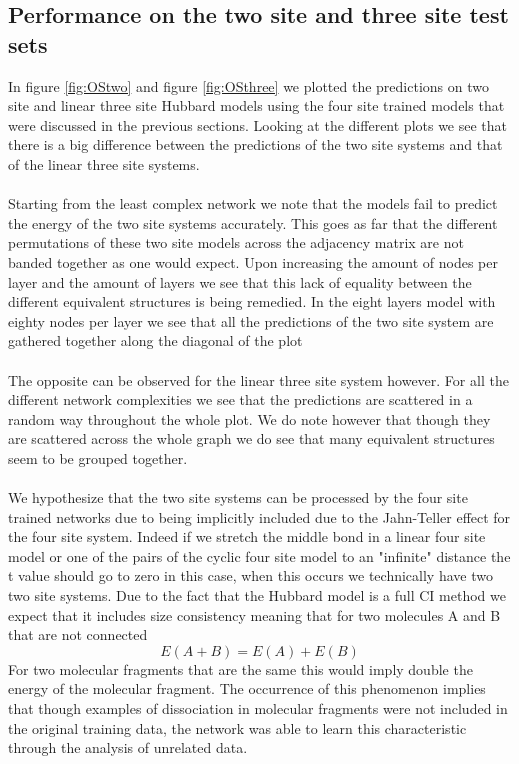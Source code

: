 \documentclass[12pt]{article}
\begin{document}
\subsection{Performance on the two site and three site test sets}
In figure \ref{fig:OStwo} and figure \ref{fig:OSthree} we plotted the predictions on two site and linear three site Hubbard models using the four site trained models that were discussed in the previous sections. Looking at the different plots we see that there is a big difference between the predictions of the two site systems and that of the linear three site systems.
\\
\\
Starting from the least complex network we note that the models fail to predict the energy of the two site systems accurately. This goes as far that the different permutations of these two site models across the adjacency matrix are not banded together as one would expect. Upon increasing the amount of nodes per layer and the amount of layers we see that this lack of equality between the different equivalent structures is being remedied. In the eight layers model with eighty nodes per layer we see that all the predictions of the two site system are gathered together along the diagonal of the plot
\\
\\
The opposite can be observed for the linear three site system however. For all the different network complexities we see that the predictions are scattered in a random way throughout the whole plot. We do note however that though they are scattered across the whole graph we do see that many equivalent structures seem to be grouped together. 
\\
\\
We hypothesize that the two site systems can be processed by the four site trained networks due to being implicitly included due to the Jahn-Teller effect for the four site system. Indeed if we stretch the middle bond in a linear four site model or one of the pairs of the cyclic four site model to an "infinite" distance the t value should go to zero in this case, when this occurs we technically have two two site systems. Due to the fact that the Hubbard model is a full CI method we expect that it includes size consistency meaning that for two molecules A and B that are not connected
\begin{equation*}
E\left(A+B\right)=E\left(A\right)+E\left(B\right)
\end{equation*} 
For two molecular fragments that are the same this would imply double the energy of the molecular fragment. The occurrence of this phenomenon implies that though examples of dissociation in molecular fragments were not included in the original training data, the network was able to learn this characteristic through the analysis of unrelated data.
\end{document}
